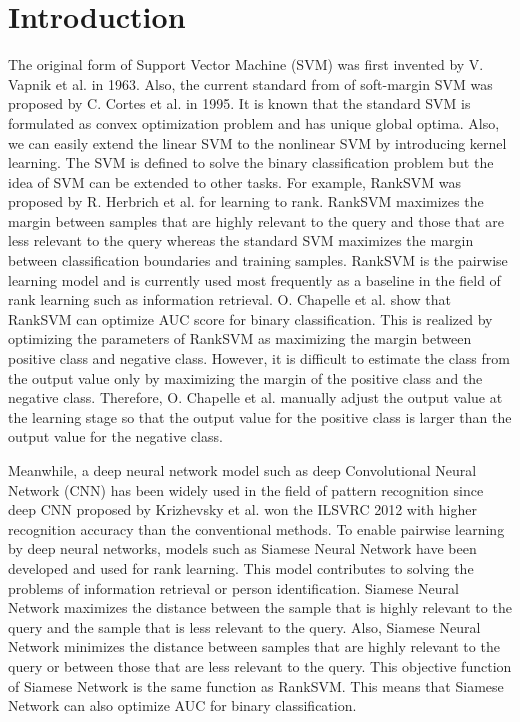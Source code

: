 \documentclass[runningheads,a4paper]{llncs}
\begin{document}
\section{Introduction}
The original form of Support Vector Machine (SVM) was first invented by V. Vapnik et al. \cite{Vapnik1963} in 1963. Also, the current standard from of soft-margin SVM was proposed by C. Cortes et al. \cite{SVM1995} in 1995.
It is known that the standard SVM is formulated as convex optimization problem and has unique global optima.
Also, we can easily extend the linear SVM to the nonlinear SVM by introducing kernel learning.
The SVM is defined to solve the binary classification problem but the idea of SVM can be extended to other tasks.
For example, RankSVM was proposed by R. Herbrich et al. \cite{RankSVM} for learning to rank. 
RankSVM maximizes the margin between samples that are highly relevant to the query and those that are less relevant to the query whereas 
the standard SVM maximizes the margin between classification boundaries and training samples.
RankSVM is the pairwise learning model and is currently used most frequently as a baseline in the field of rank learning such as information retrieval.
O. Chapelle et al. \cite{ROCAUC} show that RankSVM can optimize AUC score for binary classification.
This is realized by optimizing the parameters of RankSVM as maximizing the margin between positive class and negative class. 
However, it is difficult to estimate the class from the output value only by maximizing the margin of the positive class and the negative class.
Therefore, O. Chapelle et al. manually adjust the output value at the learning stage so that the output value for the positive class is larger than the output value for the negative class. 

Meanwhile, a deep neural network model such as deep Convolutional Neural Network (CNN) has been widely used in the field of pattern recognition since deep CNN proposed by Krizhevsky et al. \cite{Krizhevsky2012} won the ILSVRC 2012 with higher recognition accuracy than the conventional methods.
To enable pairwise learning by deep neural networks, 
models such as Siamese Neural Network \cite{Bromely1993,Chopra2005,Hadsell2006} have been developed and used for rank learning.
This model contributes to solving the problems of information retrieval or person identification.
Siamese Neural Network maximizes the distance between the sample that is highly relevant to the query and the sample that is less relevant to the query. Also, Siamese Neural Network minimizes the distance between samples that are highly relevant to the query or between those that are less relevant to the query.
This objective function of Siamese Network is the same function as RankSVM. 
This means that Siamese Network can also optimize AUC for binary classification.
\end{document}
